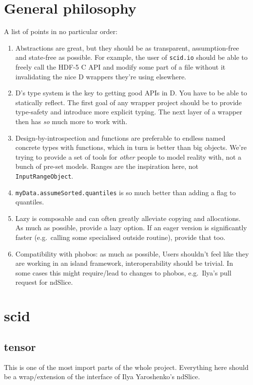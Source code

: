 \documentclass[10pt,a5paper,DIV=13]{scrartcl}
\begin{document}
\section{General philosophy}
A list of points in no particular order:
\begin{enumerate}
    \item Abstractions are great, but they should be as transparent, assumption-free and state-free as possible. For example, the user of \texttt{scid.io} should be able to freely call the HDF-5 C API and modify some part of a file without it invalidating the nice D wrappers they're using elsewhere.

    \item D's type system is the key to getting good APIs in D. You have to be able to statically reflect. The first goal of any wrapper project should be to provide type-safety and introduce more explicit typing. The next layer of a wrapper then has \emph{so} much more to work with.

    \item Design-by-introspection and functions are preferable to endless named concrete types with functions, which in turn is better than big objects. We're trying to provide a set of tools for \emph{other} people to model reality with, not a bunch of pre-set models. Ranges are the inspiration here, not \texttt{InputRangeObject}.

    \item \texttt{myData.assumeSorted.quantiles} is so much better than adding a flag to quantiles.

    \item Lazy is composable and can often greatly alleviate copying and allocations. As much as possible, provide a lazy option. If an eager version is significantly faster (e.g.\ calling some specialised outside routine), provide that too.

    \item Compatibility with phobos: as much as possible, Users shouldn't feel like they are working in an island framework, interoperability should be trivial. In some cases this might require/lead to changes to phobos, e.g.\ Ilya's pull request for ndSlice.
\end{enumerate}

\section{scid}
\subsection{tensor}
This is one of the most import parts of the whole project. Everything here should be a wrap/extension of the interface of Ilya Yaroshenko's ndSlice.
\end{document}
